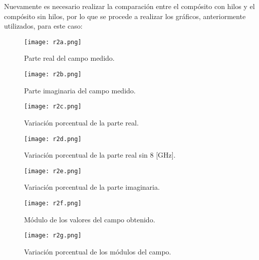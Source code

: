 \documentclass[12pt,letterpaper]{report}
\numberwithin{equation}{section}
\begin{document}

Nuevamente es necesario realizar la comparación entre el compósito con hilos y el compósito sin hilos, por lo que se procede a realizar los gráficos, anteriormente utilizados, para este caso:

\begin{figure}[H]
	\centering\texttt{[image: r2a.png]}\\
	\caption{Parte real del campo medido.}
	\label{fig:r2a}
\end{figure} 

\begin{figure}[H]
	\centering\texttt{[image: r2b.png]}\\
	\caption{Parte imaginaria del campo medido.}
	\label{fig:r2b}
\end{figure} 

\begin{figure}[H]
	\centering\texttt{[image: r2c.png]}\\
	\caption{Variación porcentual de la parte real.}
	\label{fig:r2c}
\end{figure} 

\begin{figure}[H]
	\centering\texttt{[image: r2d.png]}\\
	\caption{Variación porcentual de la parte real sin 8 [GHz].}
	\label{fig:r2d}
\end{figure} 

\begin{figure}[H]
	\centering\texttt{[image: r2e.png]}\\
	\caption{Variación porcentual de la parte imaginaria.}
	\label{fig:r2e}
\end{figure} 

\begin{figure}[H]
	\centering\texttt{[image: r2f.png]}\\
	\caption{Módulo de los valores del campo obtenido.}
	\label{fig:r2f}
\end{figure} 

\begin{figure}[H]
	\centering\texttt{[image: r2g.png]}\\
	\caption{Variación porcentual de los módulos del campo.}
	\label{fig:r2g}
\end{figure} 
\end{document}
